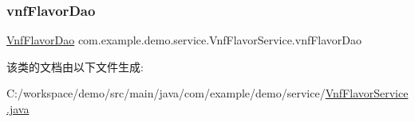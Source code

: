 \subsubsection{\texorpdfstring{vnf\+Flavor\+Dao}{vnfFlavorDao}}
{\footnotesize\ttfamily \mbox{\hyperlink{interfacecom_1_1example_1_1demo_1_1dao_1_1_vnf_flavor_dao}{Vnf\+Flavor\+Dao}} com.\+example.\+demo.\+service.\+Vnf\+Flavor\+Service.\+vnf\+Flavor\+Dao\hspace{0.3cm}{\ttfamily [package]}}



该类的文档由以下文件生成\+:\begin{DoxyCompactItemize}
\item 
C\+:/workspace/demo/src/main/java/com/example/demo/service/\mbox{\hyperlink{_vnf_flavor_service_8java}{Vnf\+Flavor\+Service.\+java}}\end{DoxyCompactItemize}
